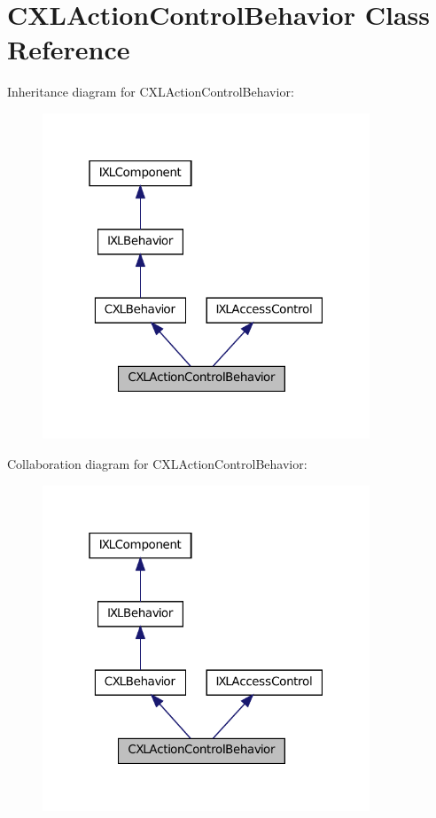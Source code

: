 \hypertarget{classCXLActionControlBehavior}{
\section{CXLActionControlBehavior Class Reference}
\label{classCXLActionControlBehavior}
}


Inheritance diagram for CXLActionControlBehavior:\nopagebreak
\begin{figure}[H]
\begin{center}
\leavevmode
\includegraphics[width=277pt]{classCXLActionControlBehavior__inherit__graph}
\end{center}
\end{figure}


Collaboration diagram for CXLActionControlBehavior:\nopagebreak
\begin{figure}[H]
\begin{center}
\leavevmode
\includegraphics[width=277pt]{classCXLActionControlBehavior__coll__graph}
\end{center}
\end{figure}
